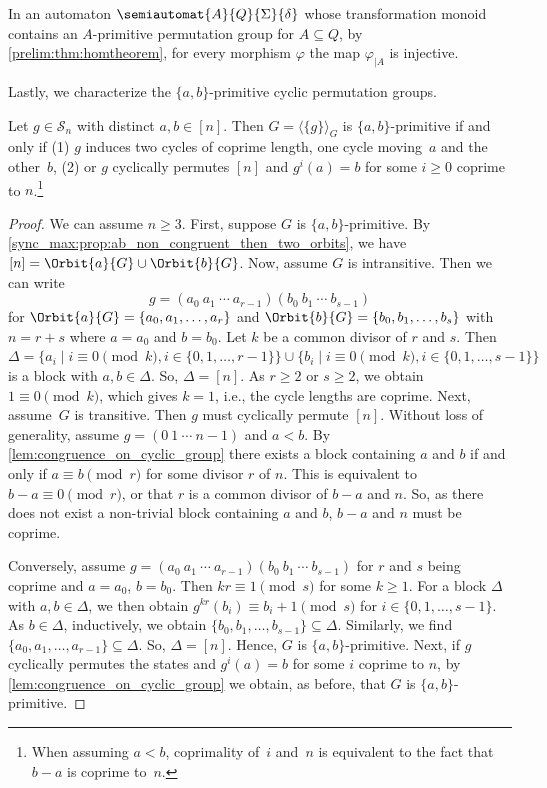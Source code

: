 In an automaton $\semiautomat{A}{Q}{\Sigma}{\delta}$ whose transformation monoid contains an $A$-primitive permutation
group for $A \subseteq Q$, by \cref{prelim:thm:homtheorem}, for every morphism $\varphi$ the map $\varphi_{|A}$ is injective.

Lastly, we characterize the $\{a,b\}$-primitive cyclic permutation groups.

\begin{proposition}\label{syncmax:prop:cyclic-group-abprim}
	Let $g \in \mathcal S_n$ with distinct $a,b \in [n]$.
	Then $G = \langle \{g\} \rangle_G$
	is $\{a,b\}$-primitive
	if and only if 
	(1) $g$ induces two cycles of coprime length, one cycle moving~$a$ and the other~$b$,
	(2) or $g$ cyclically permutes $[n]$ and  $g^i(a) = b$
	for some $i \ge 0$ coprime to $n$.\footnote{When assuming $a < b$, coprimality of~$i$ and~$n$ is equivalent
		to the fact that $b - a$ is coprime to~$n$.}
\end{proposition}
\begin{proof}
	We can assume $n \ge 3$. First, suppose $G$ is $\{a,b\}$-primitive.
	By \cref{sync_max:prop:ab_non_congruent_then_two_orbits},
	we have $[n] = \Orbit{a}{G} \cup \Orbit{b}{G}$.
	Now, assume $G$ is intransitive.
	Then we can write 
	\[ 
	g = (a_0 ~ a_1 ~ \cdots ~ a_{r-1})(b_0 ~ b_1 ~ \cdots ~ b_{s-1})
	\]
	for $\Orbit{a}{G} = \{a_0, a_1, \ldots, a_r\}$
	and $\Orbit{b}{G} = \{b_0, b_1,\ldots, b_s\}$ with $n = r + s$ where $a = a_0$ and $b = b_0$.
	Let $k$ be a common divisor of $r$ and $s$.
	Then $\Delta = \{ a_{i} \mid i \equiv 0 \pmod{k}, i \in \{0,1,\ldots,r-1\} \} \cup 
	\{ b_i \mid i \equiv 0 \pmod{k}, i \in \{0,1,\ldots,s-1\} \}$
	is a block with $a,b \in \Delta$.	
	So, $\Delta = [n]$.
	As $r \ge 2$ or $s \ge 2$,
	we obtain $1 \equiv 0 \pmod{k}$,
	which gives $k = 1$, i.e.,
	the cycle lengths are coprime.
	Next, assume~$G$ is transitive.
	Then $g$ must cyclically permute $[n]$.
	Without loss of generality, assume $g = (0 ~ 1 ~ \cdots ~ n - 1)$ and $a < b$.
	By \cref{lem:congruence_on_cyclic_group}
	there exists a block containing $a$
	and $b$ if and only if $a \equiv b \pmod{r}$
	for some divisor $r$ of $n$.
	This is equivalent to $b - a \equiv 0 \pmod{r}$, or
	that $r$ is a common divisor of $b - a$ and $n$.
	So, as there does not exist a non-trivial block
	containing $a$ and $b$, $b - a$ and $n$ must be coprime.    
	
	Conversely, assume $g = (a_0 ~ a_1 ~ \cdots ~ a_{r-1})(b_0 ~ b_1 ~ \cdots ~ b_{s-1})$
	for $r$ and $s$ being coprime and $a = a_0$, $b = b_0$.
	Then $kr \equiv 1 \pmod{s}$ for some $k \ge 1$.
	For a block $\Delta$ with $a,b \in \Delta$,
	we then obtain $g^{kr}(b_i) \equiv b_i + 1 \pmod{s}$
	for $i \in \{0,1,\ldots,s-1\}$.
	As $b \in \Delta$, inductively, we obtain $\{b_0,b_1,\ldots,b_{s-1}\} \subseteq \Delta$.
	Similarly, we find $\{a_0, a_1, \ldots, a_{r-1}\} \subseteq \Delta$.
	So, $\Delta = [n]$. Hence, $G$ is $\{a,b\}$-primitive.
	Next, if $g$ cyclically permutes the states and $g^i(a) = b$
	for some $i$ coprime to $n$,
	by \cref{lem:congruence_on_cyclic_group} 
	we obtain, as before, that $G$ is $\{a,b\}$-primitive.		
\end{proof}